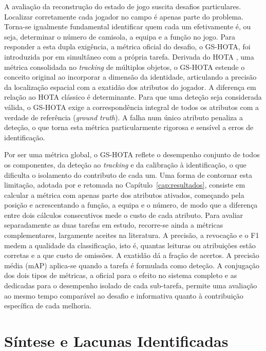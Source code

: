 A avaliação da reconstrução do estado de jogo suscita desafios particulares. Localizar
corretamente cada jogador no campo é apenas parte do problema. Torna-se igualmente
fundamental identificar quem cada um efetivamente é, ou seja, determinar o número de
camisola, a equipa e a função no jogo. Para responder a esta dupla exigência, a métrica
oficial do desafio, o GS-HOTA, foi introduzida por \citet{somers2024soccernet} em
simultâneo com a própria tarefa. Derivada do HOTA \citep{luiten2021hota}, uma métrica
consolidada no \emph{tracking} de múltiplos objetos, o GS-HOTA estende o conceito original
ao incorporar a dimensão da identidade, articulando a precisão da localização espacial com
a exatidão dos atributos do jogador. A diferença em relação ao HOTA clássico é
determinante. Para que uma deteção seja considerada válida, o GS-HOTA exige a
correspondência integral de todos os atributos com a verdade de referência (\emph{ground
truth}). A falha num único atributo penaliza a deteção, o que torna esta métrica
particularmente rigorosa e sensível a erros de identificação.

Por ser uma métrica global, o GS-HOTA reflete o desempenho conjunto de todos os
componentes, da deteção ao \emph{tracking} e da calibração à identificação, o que
dificulta o isolamento do contributo de cada um. Uma forma de contornar esta limitação,
adotada por \citet{oo2026broadcast2pitch} e retomada no Capítulo~\ref{cap:resultados},
consiste em calcular a métrica com apenas parte dos atributos ativados, começando pela
posição e acrescentando a função, a equipa e o número, de modo que a diferença entre dois
cálculos consecutivos mede o custo de cada atributo. Para avaliar separadamente as duas
tarefas em estudo, recorre-se ainda a métricas complementares, largamente aceites na
literatura. A precisão, a revocação e o F1 medem a qualidade da classificação, isto é,
quantas leituras ou atribuições estão corretas e a que custo de omissões. A exatidão dá a
fração de acertos. A precisão média (mAP) aplica-se quando a tarefa é formulada como
deteção. A conjugação dos dois tipos de métricas, a oficial para o efeito no sistema
completo e as dedicadas para o desempenho isolado de cada sub-tarefa, permite uma
avaliação ao mesmo tempo comparável ao desafio e informativa quanto à contribuição
específica de cada melhoria.

\section{Síntese e Lacunas Identificadas}


